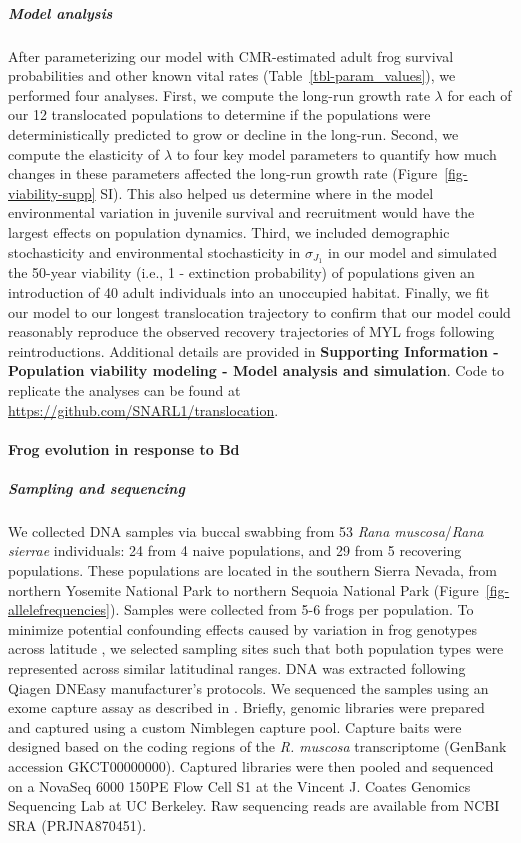 \documentclass[
  letterpaper,
  DIV=11,
  numbers=noendperiod]{scrartcl}
\let\oldparagraph\paragraph
\renewcommand{\paragraph}[1]{\oldparagraph{#1}\mbox{}}
\let\oldsubparagraph\subparagraph
\renewcommand{\subparagraph}[1]{\oldsubparagraph{#1}\mbox{}}
\begin{document}
\hypertarget{model-analysis}{%
\subparagraph{Model analysis}\label{model-analysis}}

After parameterizing our model with CMR-estimated adult frog survival
probabilities and other known vital rates
(Table~\ref{tbl-param_values}), we performed four analyses. First, we
compute the long-run growth rate \(\lambda\) for each of our 12
translocated populations to determine if the populations were
deterministically predicted to grow or decline in the long-run. Second,
we compute the elasticity of \(\lambda\) to four key model parameters to
quantify how much changes in these parameters affected the long-run
growth rate (Figure~\ref{fig-viability-supp} SI). This also helped us
determine where in the model environmental variation in juvenile
survival and recruitment would have the largest effects on population
dynamics. Third, we included demographic stochasticity and environmental
stochasticity in \(\sigma_{J_1}\) in our model and simulated the 50-year
viability (i.e., 1 - extinction probability) of populations given an
introduction of 40 adult individuals into an unoccupied habitat.
Finally, we fit our model to our longest translocation trajectory to
confirm that our model could reasonably reproduce the observed recovery
trajectories of MYL frogs following reintroductions. Additional details
are provided in \textbf{Supporting Information - Population viability
modeling - Model analysis and simulation}. Code to replicate the
analyses can be found at \url{https://github.com/SNARL1/translocation}.

\hypertarget{frog-evolution-in-response-to-bd-1}{%
\paragraph{Frog evolution in response to
Bd}\label{frog-evolution-in-response-to-bd-1}}

\hypertarget{sampling-and-sequencing}{%
\subparagraph{Sampling and sequencing}\label{sampling-and-sequencing}}

We collected DNA samples via buccal swabbing \citep{broquet2007} from 53
\emph{Rana muscosa}/\emph{Rana sierrae} individuals: 24 from 4 naive
populations, and 29 from 5 recovering populations. These populations are
located in the southern Sierra Nevada, from northern Yosemite National
Park to northern Sequoia National Park
(Figure~\ref{fig-allelefrequencies}). Samples were collected from 5-6
frogs per population. To minimize potential confounding effects caused
by variation in frog genotypes across latitude \citep{byrne2023}, we
selected sampling sites such that both population types were represented
across similar latitudinal ranges. DNA was extracted following Qiagen
DNEasy manufacturer's protocols. We sequenced the samples using an exome
capture assay as described in \citet{byrne2023}. Briefly, genomic
libraries were prepared and captured using a custom Nimblegen capture
pool. Capture baits were designed based on the coding regions of the
\emph{R. muscosa} transcriptome (GenBank accession GKCT00000000).
Captured libraries were then pooled and sequenced on a NovaSeq 6000
150PE Flow Cell S1 at the Vincent J. Coates Genomics Sequencing Lab at
UC Berkeley. Raw sequencing reads are available from NCBI SRA
(PRJNA870451).
\end{document}
